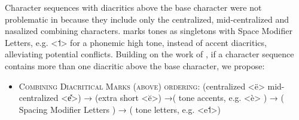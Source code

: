 Character sequences with diacritics above the base character were not
problematic in \citet{Moran2012} because they include only the centralized,
mid-centralized and nasalized combining characters. \citet{Moran2012} marks
tones as singletons with Space Modifier Letters, e.g. \textless{}˦\textgreater{}
for a phonemic high tone, instead of accent diacritics, alleviating potential
conflicts. Building on the work of \citet{Moran2012}, if a character sequence
contains more than one diacritic above the base character, we propose:

\begin{itemize}
	\itemsep1pt\parskip0pt 
	\item \textsc{Combining Diacritical Marks (above) ordering:} (centralized <ë> \textbar{} mid-centralized <e̽>) → (extra short <ĕ>) →( tone accents, e.g. <è> ) → ( Spacing Modifier Letters ) → ( tone letters, e.g. <e˦>) 
\end{itemize}